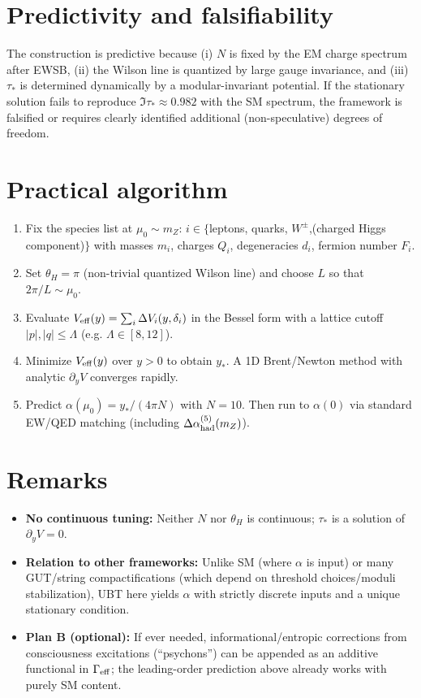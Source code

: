 \documentclass[11pt,a4paper]{article}
\begin{document}
\section{Predictivity and falsifiability}
The construction is predictive because (i) \(N\) is fixed by the EM charge spectrum after EWSB, (ii) the Wilson line is quantized by large gauge invariance, and (iii) \(\tau_*\) is determined dynamically by a modular-invariant potential. If the stationary solution fails to reproduce \(\Im\tau_*\approx 0.982\) with the SM spectrum, the framework is falsified or requires clearly identified additional (non-speculative) degrees of freedom.

\section{Practical algorithm}
\begin{enumerate}
  \item Fix the species list at \(\mu_0\sim m_Z\): \(i\in\{\)leptons, quarks, \(W^{\pm}\),(charged Higgs component)\(\}\) with masses \(m_i\), charges \(Q_i\), degeneracies \(d_i\), fermion number \(F_i\).
  \item Set \(\theta_H=\pi\) (non-trivial quantized Wilson line) and choose \(L\) so that \(2\pi/L\sim\mu_0\).
  \item Evaluate \(V_{\rm eff}(y)=\sum_i \Delta V_i(y,\delta_i)\) in the Bessel form with a lattice cutoff \(|p|,|q|\leq \Lambda\) (e.g. \(\Lambda\in[8,12]\)).
  \item Minimize \(V_{\rm eff}(y)\) over \(y>0\) to obtain \(y_*\). A 1D Brent/Newton method with analytic \(\partial_y V\) converges rapidly.
  \item Predict \(\alpha(\mu_0)=y_*/(4\pi N)\) with \(N=10\). Then run to \(\alpha(0)\) via standard EW/QED matching (including \(\Delta\alpha_{\rm had}^{(5)}(m_Z)\)).
\end{enumerate}

\section*{Remarks}
\begin{itemize}
  \item \textbf{No continuous tuning:} Neither \(N\) nor \(\theta_H\) is continuous; \(\tau_*\) is a solution of \(\partial_y V=0\).
  \item \textbf{Relation to other frameworks:} Unlike SM (where \(\alpha\) is input) or many GUT/string compactifications (which depend on threshold choices/moduli stabilization), UBT here yields \(\alpha\) with strictly discrete inputs and a unique stationary condition.
  \item \textbf{Plan B (optional):} If ever needed, informational/entropic corrections from consciousness excitations (``psychons'') can be appended as an additive functional in \(\Gamma_{\rm eff}\); the leading-order prediction above already works with purely SM content.
\end{itemize}
\end{document}
